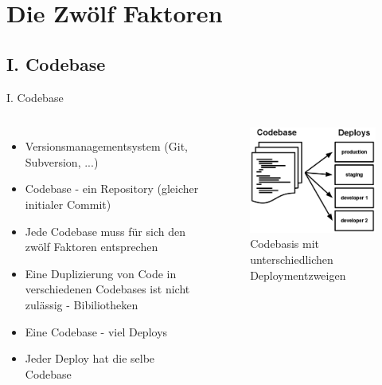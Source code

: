 \documentclass{beamer}
\begin{document}
		\section{Die Zwölf Faktoren}
			\subsection{I. Codebase}
				\begin{frame}{I. Codebase}
					\begin{columns}
							\begin{itemize}
								\item Versionsmanagementsystem (Git, Subversion, ...)
								\item Codebase - ein Repository (gleicher initialer Commit)
								\item Jede Codebase muss für sich den zwölf Faktoren entsprechen
								\item Eine Duplizierung von Code in verschiedenen Codebases ist nicht zulässig - Bibiliotheken
								\item Eine Codebase - viel Deploys
								\item Jeder Deploy hat die selbe Codebase
							\end{itemize}
						\begin{figure}
							\includegraphics[width=\textwidth]{codebase-deploys.png}
							\caption{Codebasis mit unterschiedlichen Deploymentzweigen \cite{factor-codebase}}
						\end{figure}
					\end{columns}
				\end{frame}
\end{document}
